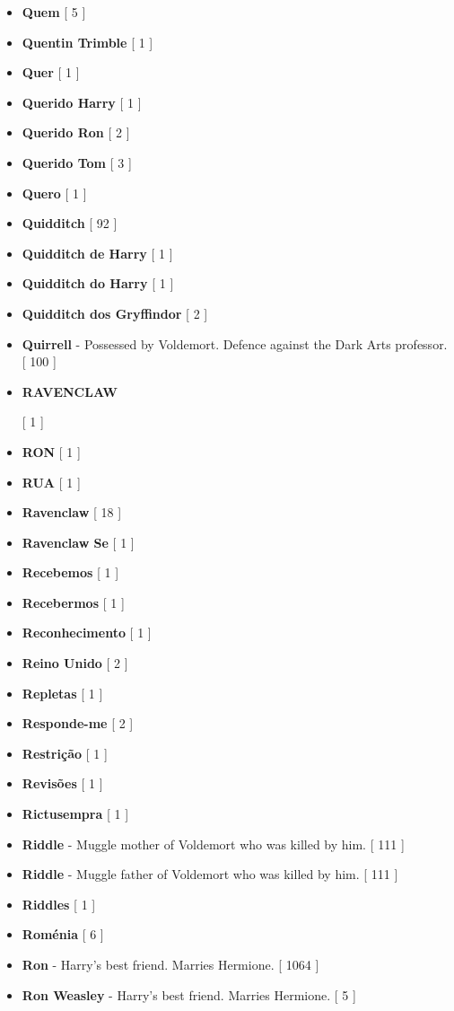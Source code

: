 \documentclass[a4paper]{article}
\begin{document}
\begin{itemize}
	\item \textbf{Quem} [ 5 ]
	\item \textbf{Quentin Trimble} [ 1 ]
	\item \textbf{Quer} [ 1 ]
	\item \textbf{Querido Harry} [ 1 ]
	\item \textbf{Querido Ron} [ 2 ]
	\item \textbf{Querido Tom} [ 3 ]
	\item \textbf{Quero} [ 1 ]
	\item \textbf{Quidditch} [ 92 ]
	\item \textbf{Quidditch de Harry} [ 1 ]
	\item \textbf{Quidditch do Harry} [ 1 ]
	\item \textbf{Quidditch dos Gryffindor} [ 2 ]
	\item \textbf{Quirrell} - Possessed by Voldemort. Defence against the Dark Arts professor. [ 100 ]
	\item \hypertarget{R}{\textbf{RAVENCLAW}} [ 1 ]
	\item \textbf{RON} [ 1 ]
	\item \textbf{RUA} [ 1 ]
	\item \textbf{Ravenclaw} [ 18 ]
	\item \textbf{Ravenclaw Se} [ 1 ]
	\item \textbf{Recebemos} [ 1 ]
	\item \textbf{Recebermos} [ 1 ]
	\item \textbf{Reconhecimento} [ 1 ]
	\item \textbf{Reino Unido} [ 2 ]
	\item \textbf{Repletas} [ 1 ]
	\item \textbf{Responde-me} [ 2 ]
	\item \textbf{Restrição} [ 1 ]
	\item \textbf{Revisões} [ 1 ]
	\item \textbf{Rictusempra} [ 1 ]
	\item \textbf{Riddle} - Muggle mother of Voldemort who was killed by him. [ 111 ]
	\item \textbf{Riddle} - Muggle father of Voldemort who was killed by him. [ 111 ]
	\item \textbf{Riddles} [ 1 ]
	\item \textbf{Roménia} [ 6 ]
	\item \textbf{Ron} - Harry's best friend. Marries Hermione. [ 1064 ]
	\item \textbf{Ron Weasley} - Harry's best friend. Marries Hermione. [ 5 ]

\end{itemize}
\end{document}
